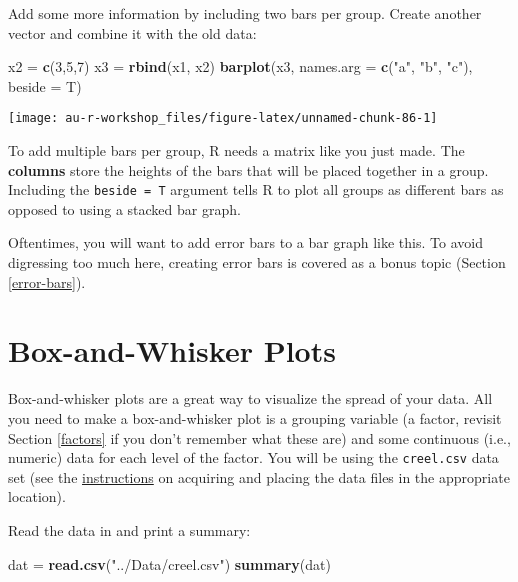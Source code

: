 \documentclass[]{book}
\newenvironment{Shaded}{\begin{snugshade}}{\end{snugshade}}
\newcommand{\KeywordTok}[1]{\textcolor[rgb]{0.13,0.29,0.53}{\textbf{#1}}}
\newcommand{\DataTypeTok}[1]{\textcolor[rgb]{0.13,0.29,0.53}{#1}}
\newcommand{\DecValTok}[1]{\textcolor[rgb]{0.00,0.00,0.81}{#1}}
\newcommand{\StringTok}[1]{\textcolor[rgb]{0.31,0.60,0.02}{#1}}
\newcommand{\NormalTok}[1]{#1}
\theoremstyle{definition}
\theoremstyle{definition}
\theoremstyle{definition}
\theoremstyle{remark}
\begin{document}
Add some more information by including two bars per group. Create
another vector and combine it with the old data:

\begin{Shaded}
\begin{Highlighting}[]
\NormalTok{x2 =}\StringTok{ }\KeywordTok{c}\NormalTok{(}\DecValTok{3}\NormalTok{,}\DecValTok{5}\NormalTok{,}\DecValTok{7}\NormalTok{)}
\NormalTok{x3 =}\StringTok{ }\KeywordTok{rbind}\NormalTok{(x1, x2)}
\KeywordTok{barplot}\NormalTok{(x3, }\DataTypeTok{names.arg =} \KeywordTok{c}\NormalTok{(}\StringTok{"a"}\NormalTok{, }\StringTok{"b"}\NormalTok{, }\StringTok{"c"}\NormalTok{), }\DataTypeTok{beside =}\NormalTok{ T)}
\end{Highlighting}
\end{Shaded}

\begin{center}\texttt{[image: au-r-workshop\_files/figure-latex/unnamed-chunk-86-1]} \end{center}

To add multiple bars per group, R needs a matrix like you just made. The
\textbf{columns} store the heights of the bars that will be placed
together in a group. Including the \texttt{beside\ =\ T} argument tells
R to plot all groups as different bars as opposed to using a stacked bar
graph.

Oftentimes, you will want to add error bars to a bar graph like this. To
avoid digressing too much here, creating error bars is covered as a
bonus topic (Section \ref{error-bars}).

\section{Box-and-Whisker Plots}\label{box-whisker}

Box-and-whisker plots are a great way to visualize the spread of your
data. All you need to make a box-and-whisker plot is a grouping variable
(a factor, revisit Section \ref{factors} if you don't remember what
these are) and some continuous (i.e., numeric) data for each level of
the factor. You will be using the \texttt{creel.csv} data set (see the
\protect\hyperlink{data-sets}{instructions} on acquiring and placing the
data files in the appropriate location).

Read the data in and print a summary:

\begin{Shaded}
\begin{Highlighting}[]
\NormalTok{dat =}\StringTok{ }\KeywordTok{read.csv}\NormalTok{(}\StringTok{"../Data/creel.csv"}\NormalTok{)}
\KeywordTok{summary}\NormalTok{(dat)}
\end{Highlighting}
\end{Shaded}
\end{document}
